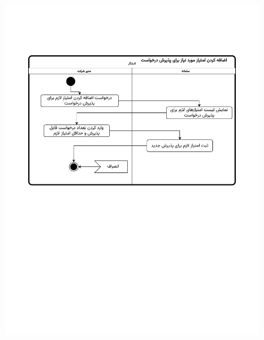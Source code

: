 \begin{figure}[ht!]
	\centering
	\includegraphics[scale=0.8, page=1]{figs/OOD-activity-reqscore.pdf}
\end{figure}
\FloatBarrier
\newpage

